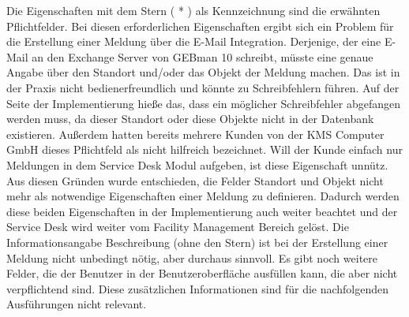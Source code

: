 \noindent
Die Eigenschaften mit dem Stern ( * ) als Kennzeichnung sind die erwähnten Pflichtfelder. Bei diesen erforderlichen Eigenschaften ergibt sich ein Problem für die Erstellung einer Meldung über die E-Mail Integration. Derjenige, der eine E-Mail an den Exchange Server von GEBman 10 schreibt, müsste eine genaue Angabe über den Standort und/oder das Objekt der Meldung machen. Das ist in der Praxis nicht bedienerfreundlich und könnte zu Schreibfehlern führen. Auf der Seite der Implementierung hieße das, dass ein möglicher Schreibfehler abgefangen werden muss, da dieser Standort oder diese Objekte nicht in der Datenbank existieren. Außerdem hatten bereits mehrere Kunden von der KMS Computer GmbH dieses Pflichtfeld als nicht hilfreich bezeichnet. Will der Kunde einfach nur Meldungen in dem Service Desk Modul aufgeben, ist diese Eigenschaft unnütz. Aus diesen Gründen wurde entschieden, die Felder Standort und Objekt nicht mehr als notwendige Eigenschaften einer Meldung zu definieren. Dadurch werden diese beiden Eigenschaften in der Implementierung auch weiter beachtet und der Service Desk wird weiter vom Facility Management Bereich gelöst. \newline
Die Informationsangabe Beschreibung (ohne den Stern) ist bei der Erstellung einer Meldung nicht unbedingt nötig, aber durchaus sinnvoll. Es gibt noch weitere Felder, die der Benutzer in der Benutzeroberfläche ausfüllen kann, die aber nicht verpflichtend sind. Diese zusätzlichen Informationen sind für die nachfolgenden Ausführungen nicht relevant.

